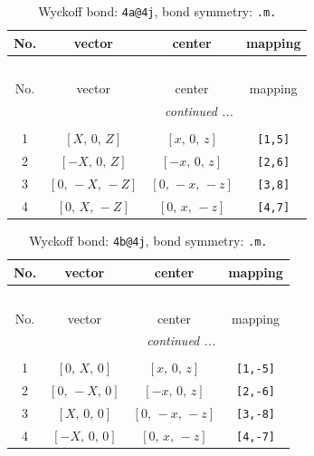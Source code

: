 \documentclass[fleqn,8pt]{jsarticle}
\begin{document}
\begin{longtable}{cccc}
\caption{Wyckoff bond: {\tt 4a@4j}, bond symmetry: {\tt .m.}}
 \\
 \hline \hline
No. & vector & center & mapping \\ \hline \endfirsthead

\multicolumn{3}{l}{\tablename\ \thetable{}} \\
 \hline \hline
No. & vector & center & mapping \\ \hline \endhead

 \hline \hline
\multicolumn{3}{r}{\footnotesize\it continued ...} \\ \endfoot

 \hline \hline
\multicolumn{3}{r}{} \\ \endlastfoot

1 & $\left[ X,\, 0,\, Z \right]$ & $\left[ x,\, 0,\, z \right]$ & {\tt [1,5]} \\ \hline
2 & $\left[ - X,\, 0,\, Z \right]$ & $\left[ - x,\, 0,\, z \right]$ & {\tt [2,6]} \\ \hline
3 & $\left[ 0,\, - X,\, - Z \right]$ & $\left[ 0,\, - x,\, - z \right]$ & {\tt [3,8]} \\ \hline
4 & $\left[ 0,\, X,\, - Z \right]$ & $\left[ 0,\, x,\, - z \right]$ & {\tt [4,7]} \\
\end{longtable}
\renewcommand{\arraystretch}{1.2}
\begin{longtable}{cccc}
\caption{Wyckoff bond: {\tt 4b@4j}, bond symmetry: {\tt .m.}}
 \\
 \hline \hline
No. & vector & center & mapping \\ \hline \endfirsthead

\multicolumn{3}{l}{\tablename\ \thetable{}} \\
 \hline \hline
No. & vector & center & mapping \\ \hline \endhead

 \hline \hline
\multicolumn{3}{r}{\footnotesize\it continued ...} \\ \endfoot

 \hline \hline
\multicolumn{3}{r}{} \\ \endlastfoot

1 & $\left[ 0,\, X,\, 0 \right]$ & $\left[ x,\, 0,\, z \right]$ & {\tt [1,-5]} \\ \hline
2 & $\left[ 0,\, - X,\, 0 \right]$ & $\left[ - x,\, 0,\, z \right]$ & {\tt [2,-6]} \\ \hline
3 & $\left[ X,\, 0,\, 0 \right]$ & $\left[ 0,\, - x,\, - z \right]$ & {\tt [3,-8]} \\ \hline
4 & $\left[ - X,\, 0,\, 0 \right]$ & $\left[ 0,\, x,\, - z \right]$ & {\tt [4,-7]} \\
\end{longtable}
\end{document}
